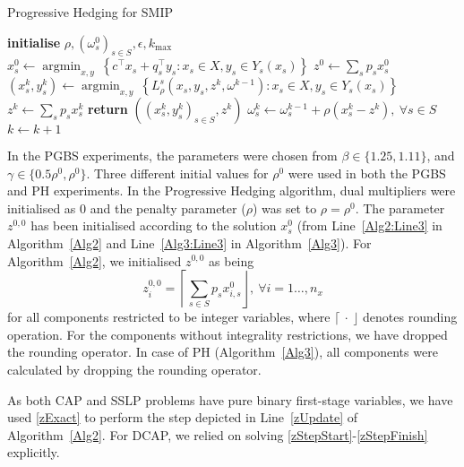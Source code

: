 \documentclass[preprint, 1p, review]{elsarticle}
\newcommand{\braces}[1]{\left\{ #1 \right \}}
\DeclareMathOperator*{\argmin}{argmin}
\begin{document}
\begin{algorithm}[H]
\caption{Progressive Hedging for SMIP}\label{Alg3}
\begin{algorithmic}[1] %
\State \textbf{initialise} $\rho, (\omega^0_s)_{s \in S},\epsilon, k_{\text{max}}$
   \State $x^0_s \gets \argmin_{x,y} \ \braces{c^\top x_s + q_s^\top y_s : x_s \in X, y_s \in Y_s(x_s)}$ \label{Alg3:Line3}
\EndFor
\State $z^0 \gets \sum_{s}p_s x^0_s$ 
        \State $(x_s^{k},y_s^{k}) \gets \argmin_{x,y} \ \braces{L^s_{\rho} (x_s,y_s,z^k,\omega^{k-1}) : x_s \in X, y_s \in Y_s(x_s)}$ \label{PHSubProb}
    \EndFor     
    \State $z^{k} \gets \sum_{s}p_s x^k_s$ \label{PHAveraging}
        \State \textbf{return } $((x_s^k, y_s^k)_{s\in S}, z^k)$    
    \Else \quad 
        \State $\omega_s^{k} \gets \omega_s^{k-1} + \rho (x_s^{k} - z^{k}), \ \forall s \in S$
    \EndIf
     \State $k \gets k + 1$
\EndFor
\end{algorithmic}
\end{algorithm}

In the PGBS experiments, the parameters were chosen from $\beta \in \{1.25, 1.11\}$,  and $\gamma \in \{0.5\rho^0, \rho^0\}$. Three different initial values for $\rho^0$ were used in both the PGBS and PH experiments. In the Progressive Hedging algorithm, dual multipliers were initialised as $0$ and the penalty parameter ($\rho$) was set to $\rho=\rho^0$. The parameter $z^{0,0}$ has been initialised according to the solution $x^0_s$ (from Line~\ref{Alg2:Line3} in Algorithm~\ref{Alg2} and Line~\ref{Alg3:Line3} in Algorithm~\ref{Alg3}). For Algorithm~\ref{Alg2}, we initialised $z^{0,0}$ as being
%
\begin{equation}
z_i^{0,0} = \left\lceil \sum_{s \in S}p_s x^0_{i,s} \right\rfloor, \ \forall i= 1\dots,n_x
\end{equation}
%
for all components restricted to be integer variables, where $\lceil \ \cdot \ \rfloor$ denotes rounding operation. For the components without integrality restrictions, we have dropped the rounding operator. In case of PH (Algorithm~\ref{Alg3}), all components were calculated by dropping the rounding operator.  

As both CAP and SSLP problems have pure binary first-stage variables, we have used \eqref{zExact} to perform the step depicted in Line~\ref{zUpdate} of Algorithm~\ref{Alg2}. For DCAP, we relied on solving \eqref{zStepStart}-\eqref{zStepFinish} explicitly. 
\end{document}
